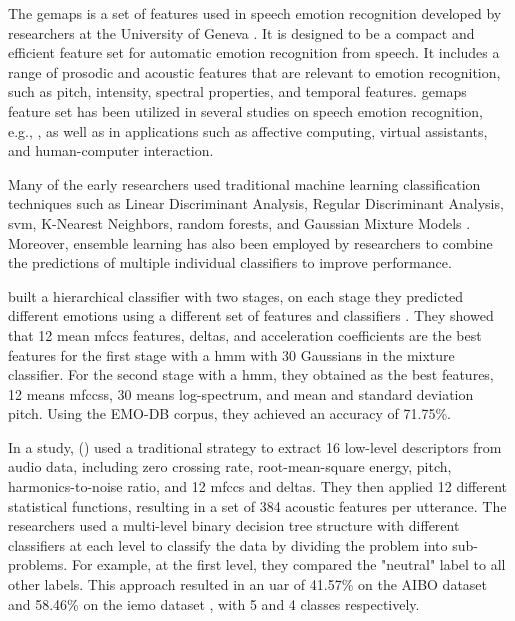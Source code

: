 The \ac{gemaps} is a set of features used in speech emotion recognition developed by researchers at the University of Geneva \cite{Eyben2016}. It is designed to be a compact and efficient feature set for automatic emotion recognition from speech. It includes a range of prosodic and acoustic features that are relevant to emotion recognition, such as pitch, intensity, spectral properties, and temporal features. \ac{gemaps} feature set has been utilized in several studies on speech emotion recognition, e.g., \cite{Tarantino2019}, as well as in applications such as affective computing, virtual assistants, and human-computer interaction.

Many of the early researchers used traditional machine learning classification techniques such as Linear Discriminant Analysis, Regular Discriminant Analysis, \ac{svm}, K-Nearest Neighbors, \acp{random forest}, and Gaussian Mixture Models \cite{Kuchibhotla2014}. Moreover, ensemble learning has also been employed by researchers to combine the predictions of multiple individual classifiers to improve performance.

\citeauthor{Albornoz2011} built a hierarchical classifier with two stages, on each stage they predicted different emotions using a different set of features and classifiers \cite{Albornoz2011}. They showed that 12 mean \ac{mfccs} features, deltas, and acceleration coefficients are the best features for the first stage with a \ac{hmm} with 30 Gaussians in the mixture classifier. For the second stage with a \ac{hmm}, they obtained as the best features, 12 means \acp{mfccs}, 30 means log-spectrum, and mean and standard deviation pitch. Using the EMO-DB corpus, they achieved an accuracy of 71.75\%.

In a study, \citeauthor{Lee2011} (\citeyear{Lee2011}) used a traditional strategy to extract 16 low-level descriptors from audio data, including zero crossing rate, root-mean-square energy, pitch, harmonics-to-noise ratio, and 12 \ac{mfccs} and deltas. They then applied 12 different statistical functions, resulting in a set of 384 acoustic features per utterance. The researchers used a multi-level binary decision tree structure with different classifiers at each level to classify the data by dividing the problem into sub-problems. For example, at the first level, they compared the "neutral" label to all other labels. This approach resulted in an \ac{uar} of 41.57\% on the AIBO dataset and 58.46\% on the \ac{iemo} dataset \cite{Lee2011}, with 5 and 4 classes respectively.

